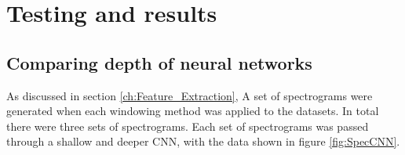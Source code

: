 \documentclass[class=report,11pt,crop=false]{standalone}
\begin{document}
\ifstandalone
\tableofcontents
\fi
\section{Testing and results \label{ch:T_R}}







\subsection{Comparing depth of neural networks} \label{ss:networkdepths}

As discussed in section \ref{ch:Feature_Extraction}, A set of spectrograms were generated when each windowing method was applied to the datasets. In total there were three sets of spectrograms. Each set of spectrograms was passed through a shallow and deeper CNN, with the data shown in figure \ref{fig:SpecCNN}.
\end{document}
